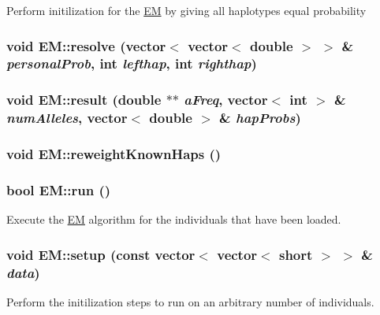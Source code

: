 \label{classEM_a8531164d0fa92217eb0c7d9f75382912}
Perform initilization for the \hyperlink{classEM}{EM} by giving all haplotypes equal probability \hypertarget{classEM_a1bd0c351ef1ee04ad0552f2066d7f3d7}{
\subsubsection[{resolve}]{\setlength{\rightskip}{0pt plus 5cm}void EM::resolve (vector$<$ vector$<$ double $>$ $>$ \& {\em personalProb}, \/  int {\em lefthap}, \/  int {\em righthap})}}
\label{classEM_a1bd0c351ef1ee04ad0552f2066d7f3d7}
\hypertarget{classEM_abe803c5ae01733a57224c3d530ae2921}{
\subsubsection[{result}]{\setlength{\rightskip}{0pt plus 5cm}void EM::result (double $\ast$$\ast$ {\em aFreq}, \/  vector$<$ int $>$ \& {\em numAlleles}, \/  vector$<$ double $>$ \& {\em hapProbs})}}
\label{classEM_abe803c5ae01733a57224c3d530ae2921}
\hypertarget{classEM_a7a49c56e4c55158f0c1ff4ec6a9469e3}{
\subsubsection[{reweightKnownHaps}]{\setlength{\rightskip}{0pt plus 5cm}void EM::reweightKnownHaps ()}}
\label{classEM_a7a49c56e4c55158f0c1ff4ec6a9469e3}
\hypertarget{classEM_a18638c8e6a8da46ca0ea77981c275486}{
\subsubsection[{run}]{\setlength{\rightskip}{0pt plus 5cm}bool EM::run ()}}
\label{classEM_a18638c8e6a8da46ca0ea77981c275486}
Execute the \hyperlink{classEM}{EM} algorithm for the individuals that have been loaded. \hypertarget{classEM_abcc9e390b2a2c8143bfa364a7911d6fa}{
\subsubsection[{setup}]{\setlength{\rightskip}{0pt plus 5cm}void EM::setup (const vector$<$ vector$<$ short $>$ $>$ \& {\em data})}}
\label{classEM_abcc9e390b2a2c8143bfa364a7911d6fa}
Perform the initilization steps to run on an arbitrary number of individuals.


